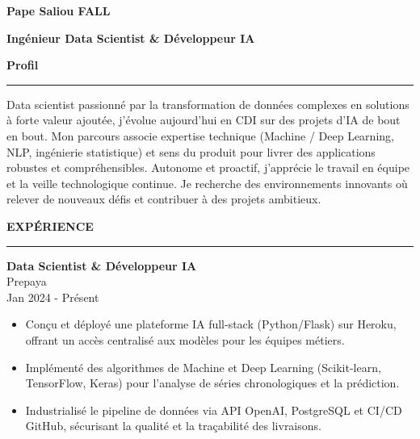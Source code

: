\documentclass{article}
\newcommand{\cvsection}[1]{%
  \par\bigskip                %
  {\bfseries\Large #1}\par
  \noindent\rule{\linewidth}{0.8pt}\par
  \smallskip               %
}
\newcommand*{\ClipSep}{0.4cm}
\begin{document}
\pagestyle{empty}
\begin{paracol}{2}

\begin{minipage}{0.7\linewidth}
{\LARGE\textbf{Pape Saliou FALL}}

\bigskip
{\large\textbf{Ingénieur Data Scientist \& Développeur IA}}
\end{minipage}\hfill
\begin{minipage}{0.18\linewidth}
\end{minipage}

\cvsection{Profil}
Data scientist passionné par la transformation de données complexes en solutions à forte valeur ajoutée, j’évolue aujourd’hui en CDI sur des projets d’IA de bout en bout. Mon parcours associe expertise technique (Machine / Deep Learning, NLP, ingénierie statistique) et sens du produit pour livrer des applications robustes et compréhensibles. Autonome et proactif, j’apprécie le travail en équipe et la veille technologique continue. Je recherche des environnements innovants où relever de nouveaux défis et contribuer à des projets ambitieux.

\cvsection{EXPÉRIENCE}

\colorbox{maincolor}{%
  \begin{minipage}{\linewidth}
    \textbf{Data Scientist \& Développeur IA} \\ Prepaya \\ Jan 2024 - Présent
    \begin{itemize}
      \item Conçu et déployé une plateforme IA full-stack (Python/Flask) sur Heroku, offrant un accès centralisé aux modèles pour les équipes métiers. \item Implémenté des algorithmes de Machine et Deep Learning (Scikit-learn, TensorFlow, Keras) pour l’analyse de séries chronologiques et la prédiction. \item Industrialisé le pipeline de données via API OpenAI, PostgreSQL et CI/CD GitHub, sécurisant la qualité et la traçabilité des livraisons.
    \end{itemize}
  \end{minipage}}


\end{paracol}
\end{document}
